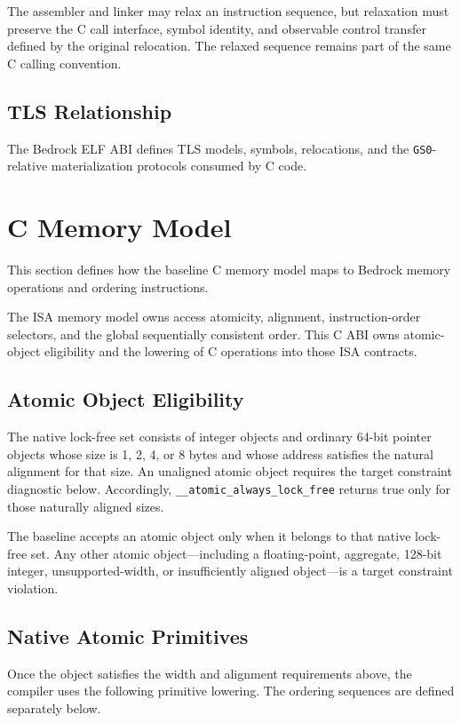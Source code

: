 \documentclass[10pt,twoside]{article}
\begin{document}
The assembler and linker may relax an instruction sequence, but relaxation
must preserve the C call interface, symbol identity, and observable control
transfer defined by the original relocation. The relaxed sequence remains part
of the same C calling convention.

\subsection{TLS Relationship}
The Bedrock ELF ABI defines TLS models, symbols, relocations, and the
\texttt{GS0}-relative materialization protocols consumed by C code.

\section{C Memory Model}\label{page:c-memory-model}
This section defines how the baseline C memory model maps to Bedrock memory
operations and ordering instructions.

The ISA memory model owns access atomicity, alignment, instruction-order
selectors, and the global sequentially consistent order. This C ABI owns
atomic-object eligibility and the lowering of C operations into those ISA
contracts.

\subsection{Atomic Object Eligibility}
The native lock-free set consists of integer objects and ordinary 64-bit
pointer objects whose size is 1, 2, 4, or 8 bytes and whose address satisfies
the natural alignment for that size. An unaligned atomic object requires the
target constraint diagnostic below. Accordingly, \texttt{\_\_atomic\_always\_lock\_free} returns true
only for those naturally aligned sizes.

The baseline accepts an atomic object only when it belongs to that native
lock-free set. Any other atomic object---including a floating-point, aggregate,
128-bit integer, unsupported-width, or insufficiently aligned
object---is a target constraint violation.

\subsection{Native Atomic Primitives}
Once the object satisfies the width and alignment requirements above, the
compiler uses the following primitive lowering. The ordering sequences are
defined separately below.
\end{document}
